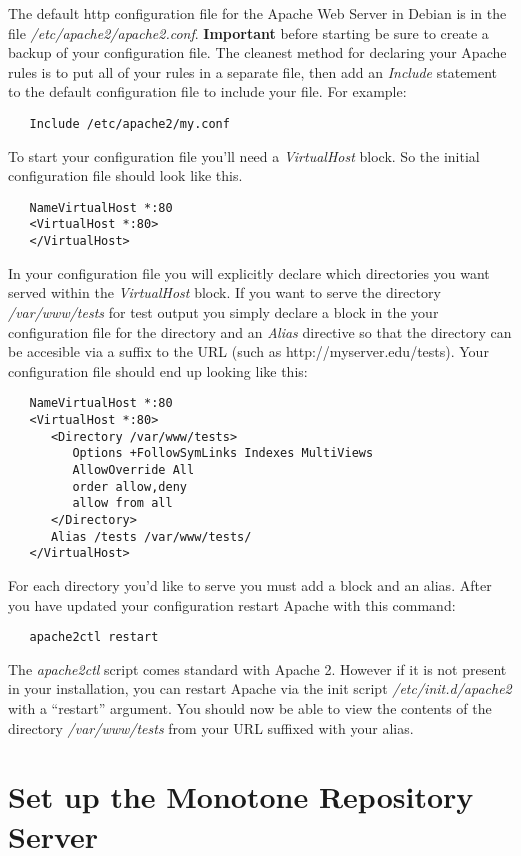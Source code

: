 \documentclass[12pt]{article}
\begin{document}
The default http configuration file for the Apache Web Server in Debian is in the file {\it /etc/apache2/apache2.conf}.  \textbf{Important} before starting be sure to create a backup of your configuration file. The cleanest method for declaring your Apache rules is to put all of your rules in a separate file, then add an {\it Include} statement to the default configuration file to include your file. For example:
\begin{verbatim}
   Include /etc/apache2/my.conf
\end{verbatim}
To start your configuration file you'll need a {\it VirtualHost} block. So the initial configuration file should look like this.
\begin{verbatim}
   NameVirtualHost *:80
   <VirtualHost *:80>
   </VirtualHost>
\end{verbatim}
In your configuration file you will explicitly declare which directories you want served within the {\it VirtualHost} block. If you want to serve the directory {\it /var/www/tests} for test output you simply declare a block in the your configuration file for the directory and an {\it Alias} directive so that the directory can be accesible via a suffix to the URL (such as http://myserver.edu/tests). Your configuration file should end up looking like this:
\begin{verbatim}
   NameVirtualHost *:80
   <VirtualHost *:80>   
      <Directory /var/www/tests>
         Options +FollowSymLinks Indexes MultiViews
         AllowOverride All
         order allow,deny
         allow from all
      </Directory>
      Alias /tests /var/www/tests/
   </VirtualHost>
\end{verbatim}
For each directory you'd like to serve you must add a block and an alias. After you have updated your configuration restart Apache with this command:
\begin{verbatim}
   apache2ctl restart
\end{verbatim}
The \textit{apache2ctl} script comes standard with Apache 2. However if it is not present in your installation, you can restart Apache via the init script \textit{/etc/init.d/apache2} with a ``restart'' argument. You should now be able to view the contents of the directory {\it /var/www/tests} from your URL suffixed with your alias.

\section*{Set up the Monotone Repository Server}
\end{document}
